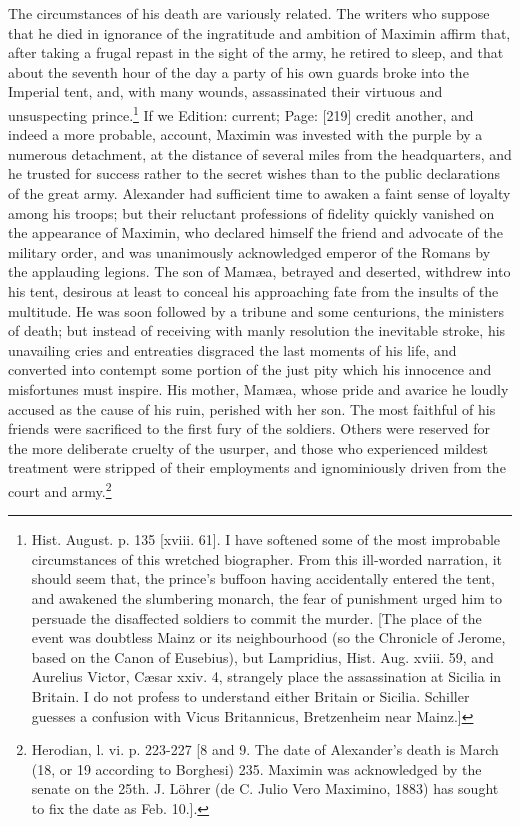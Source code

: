 The circumstances of his death are variously related. The writers who suppose that he died in ignorance of the ingratitude and ambition of Maximin affirm that, after taking a frugal repast in the sight of the army, he retired to sleep, and that about the seventh hour of the day a party of his own guards broke into the Imperial tent, and, with many wounds, assassinated their virtuous and unsuspecting prince.\footnote{Hist. August. p. 135 [xviii. 61]. I have softened some of the most improbable circumstances of this wretched biographer. From this ill-worded narration, it should seem that, the prince\texthebrew{}’s buffoon having accidentally entered the tent, and awakened the slumbering monarch, the fear of punishment urged him to persuade the disaffected soldiers to commit the murder. [The place of the event was doubtless Mainz or its neighbourhood (so the Chronicle of Jerome, based on the Canon of Eusebius), but Lampridius, Hist. Aug. xviii. 59, and Aurelius Victor, Cæsar xxiv. 4, strangely place the assassination at Sicilia in Britain. I do not profess to understand either Britain or Sicilia. Schiller guesses a confusion with Vicus Britannicus, Bretzenheim near Mainz.]} If we Edition: current; Page: [219] credit another, and indeed a more probable, account, Maximin was invested with the purple by a numerous detachment, at the distance of several miles from the headquarters, and he trusted for success rather to the secret wishes than to the public declarations of the great army. Alexander had sufficient time to awaken a faint sense of loyalty among his troops; but their reluctant professions of fidelity quickly vanished on the appearance of Maximin, who declared himself the friend and advocate of the military order, and was unanimously acknowledged emperor of the Romans by the applauding legions. The son of Mamæa, betrayed and deserted, withdrew into his tent, desirous at least to conceal his approaching fate from the insults of the multitude. He was soon followed by a tribune and some centurions, the ministers of death; but instead of receiving with manly resolution the inevitable stroke, his unavailing cries and entreaties disgraced the last moments of his life, and converted into contempt some portion of the just pity which his innocence and misfortunes must inspire. His mother, Mamæa, whose pride and avarice he loudly accused as the cause of his ruin, perished with her son. The most faithful of his friends were sacrificed to the first fury of the soldiers. Others were reserved for the more deliberate cruelty of the usurper, and those who experienced mildest treatment were stripped of their employments and ignominiously driven from the court and army.\footnote{Herodian, l. vi. p. 223-227 [8 and 9. The date of Alexander\texthebrew{}’s death is March (18, or 19 according to Borghesi) 235. Maximin was acknowledged by the senate on the 25th. J. Löhrer (de C. Julio Vero Maximino, 1883) has sought to fix the date as Feb. 10.].}

